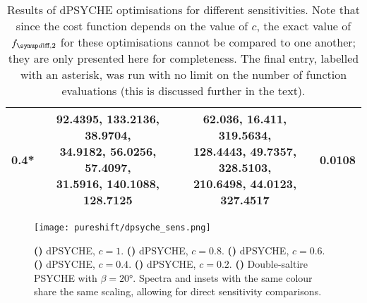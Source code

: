 \begin{table}[htb]
\begin{tabular}{cccc}
        \midrule
        0.4* & \makecell{92.4395, 133.2136, 38.9704, \\ 34.9182, 56.0256, 57.4097, \\ 31.5916, 140.1088, 128.7125} & \makecell{62.036, 16.411, 319.5634, \\ 128.4443, 49.7357, 328.5103, \\ 210.6498, 44.0123, 327.4517} & 0.0108 \\
        \bottomrule
    \end{tabular}
    \caption[dPSYCHE optimisation results for different sensitivities]{
        Results of dPSYCHE optimisations for different sensitivities.
        Note that since the cost function depends on the value of $c$, the exact value of $\fdifftwo$ for these optimisations cannot be compared to one another; they are only presented here for completeness.
        The final entry, labelled with an asterisk, was run with no limit on the number of function evaluations (this is discussed further in the text).
    }
    \label{tbl:dpsyche_sens}
\end{table}

\begin{figure}[htbp]
    \centering
    \texttt{[image: pureshift/dpsyche\_sens.png]}%
    {\label{fig:dpsyche_sens_d1}}%
    {\label{fig:dpsyche_sens_d0p8}}%
    {\label{fig:dpsyche_sens_d0p6}}%
    {\label{fig:dpsyche_sens_d0p4}}%
    {\label{fig:dpsyche_sens_d0p2}}%
    {\label{fig:dpsyche_sens_p}}%
    \caption[dPSYCHE optimisations with different sensitivities]{
        \textbf{()} dPSYCHE, $c = 1$.
        \textbf{()} dPSYCHE, $c = 0.8$.
        \textbf{()} dPSYCHE, $c = 0.6$.
        \textbf{()} dPSYCHE, $c = 0.4$.
        \textbf{()} dPSYCHE, $c = 0.2$.
        \textbf{()} Double-saltire PSYCHE with $\beta = \ang{20}$.
        Spectra and insets with the same colour share the same scaling, allowing for direct sensitivity comparisons.
    }
    \label{fig:dpsyche_sens}
\end{figure}

